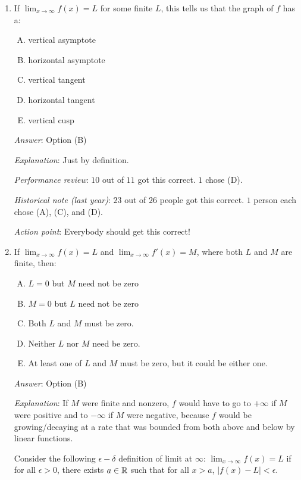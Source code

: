 \documentclass[10pt]{amsart}
\begin{document}
\begin{enumerate}
\item If $\lim_{x \to \infty} f(x) = L$ for some finite $L$, this tells
  us that the graph of $f$ has a:

  \begin{enumerate}[(A)]
  \item vertical asymptote
  \item horizontal asymptote
  \item vertical tangent
  \item horizontal tangent
  \item vertical cusp
  \end{enumerate}

  {\em Answer}: Option (B)

  {\em Explanation}: Just by definition.

  {\em Performance review}: $10$ out of $11$ got this correct. $1$
  chose (D).

  {\em Historical note (last year)}: $23$ out of $26$ people got this
  correct. $1$ person each chose (A), (C), and (D).

  {\em Action point}: Everybody should get this correct!
\item If $\lim_{x \to \infty} f(x) = L$ and $\lim_{x \to \infty} f'(x)
  = M$, where both $L$ and $M$ are finite, then:

  \begin{enumerate}[(A)]
  \item $L = 0$ but $M$ need not be zero
  \item $M = 0$ but $L$ need not be zero
  \item Both $L$ and $M$ must be zero.
  \item Neither $L$ nor $M$ need be zero.
  \item At least one of $L$ and $M$ must be zero, but it could be
    either one.
  \end{enumerate}

  {\em Answer}: Option (B)

  {\em Explanation}: If $M$ were finite and nonzero, $f$ would have to
  go to $+\infty$ if $M$ were positive and to $-\infty$ if $M$ were
  negative, because $f$ would be growing/decaying at a rate that was
  bounded from both above and below by linear functions.

  Consider the following $\epsilon-\delta$ definition of limit at
  $\infty$: $\lim_{x \to \infty} f(x) = L$ if for all $\epsilon > 0$,
  there exists $a \in \mathbb{R}$ such that for all $x > a$, $|f(x) - L| <
  \epsilon$. 


\end{enumerate}
\end{document}
